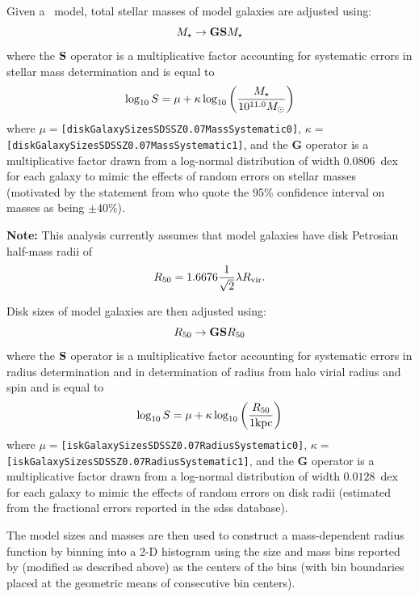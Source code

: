 Given a \glc\ model, total stellar masses of model galaxies are adjusted using:
\begin{equation}
 M_\star \rightarrow {\bf G} {\bf S} M_\star 
\end{equation}
where the ${\bf S}$ operator is a multiplicative factor accounting for systematic errors in stellar mass determination and is equal to \citep{behroozi_comprehensive_2010}
\begin{equation}
 \log_{\rm 10} S = \mu + \kappa \log_{\rm 10} \left({M_\star \over 10^{11.0}M_\odot}\right)
\end{equation}
where $\mu=${\tt [diskGalaxySizesSDSSZ0.07MassSystematic0]}, $\kappa=${\tt [diskGalaxySizesSDSSZ0.07MassSystematic1]}, and the {\bf G} operator is a multiplicative factor drawn from a log-normal distribution of width $0.0806$~dex for each galaxy to mimic the effects of random errors on stellar masses (motivated by the statement from \cite{shen_size_2003} who quote the 95\% confidence
interval on masses as being $\pm 40$\%).

{\bf Note:} This analysis currently assumes that model galaxies have disk Petrosian half-mass radii of
\begin{equation}
 R_{\rm 50} = 1.6676 {1 \over \sqrt{2}} \lambda R_{\rm vir}.
\end{equation}

Disk sizes of model galaxies are then adjusted using:
\begin{equation}
 R_{50} \rightarrow {\bf G} {\bf S} R_{50} 
\end{equation}
where the ${\bf S}$ operator is a multiplicative factor accounting for systematic errors in radius determination and in determination of radius from halo virial radius and spin and is equal to
\begin{equation}
 \log_{\rm 10} S = \mu + \kappa \log_{\rm 10} \left({R_{50} \over 1 \hbox{kpc}}\right)
\end{equation}
where $\mu=${\tt [iskGalaxySizesSDSSZ0.07RadiusSystematic0]}, $\kappa=${\tt [iskGalaxySizesSDSSZ0.07RadiusSystematic1]}, and the {\bf G} operator is a multiplicative factor drawn from a log-normal distribution of width $0.0128$~dex for each galaxy to mimic the effects of random errors on disk radii (estimated from the fractional errors reported in the \gls{sdss} database).

The model sizes and masses are then used to construct a mass-dependent radius function by binning into a 2-D histogram using the size and mass bins reported by \cite{shen_size_2003} (modified as described above) as the centers of the bins (with bin boundaries placed at the geometric means of consecutive bin centers).

